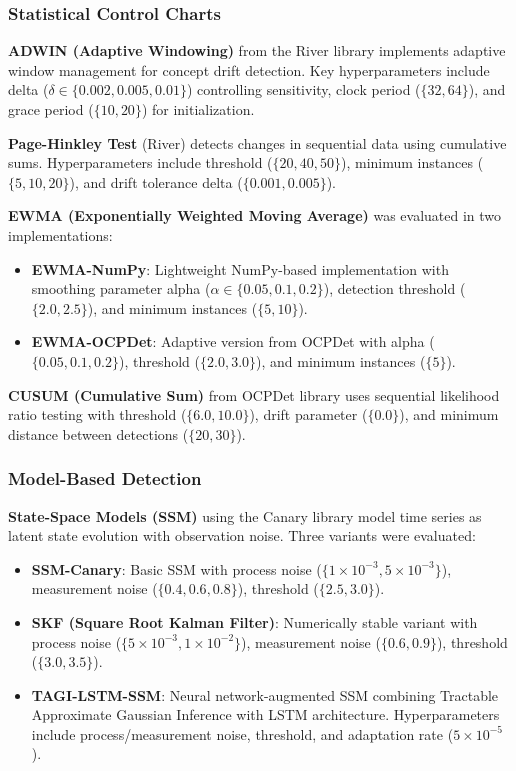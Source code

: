 \documentclass[journal,article,submit,pdftex,moreauthors]{Definitions/mdpi}
\begin{document}
\subsubsection{Statistical Control Charts}

\textbf{ADWIN (Adaptive Windowing)} from the River library implements adaptive window management for concept drift detection. Key hyperparameters include delta ($\delta \in \{0.002, 0.005, 0.01\}$) controlling sensitivity, clock period ($\{32, 64\}$), and grace period ($\{10, 20\}$) for initialization.

\textbf{Page-Hinkley Test} (River) detects changes in sequential data using cumulative sums. Hyperparameters include threshold ($\{20, 40, 50\}$), minimum instances ($\{5, 10, 20\}$), and drift tolerance delta ($\{0.001, 0.005\}$).

\textbf{EWMA (Exponentially Weighted Moving Average)} was evaluated in two implementations:
\begin{itemize}
    \item \textbf{EWMA-NumPy}: Lightweight NumPy-based implementation with smoothing parameter alpha ($\alpha \in \{0.05, 0.1, 0.2\}$), detection threshold ($\{2.0, 2.5\}$), and minimum instances ($\{5, 10\}$).
    \item \textbf{EWMA-OCPDet}: Adaptive version from OCPDet with alpha ($\{0.05, 0.1, 0.2\}$), threshold ($\{2.0, 3.0\}$), and minimum instances ($\{5\}$).
\end{itemize}

\textbf{CUSUM (Cumulative Sum)} from OCPDet library uses sequential likelihood ratio testing with threshold ($\{6.0, 10.0\}$), drift parameter ($\{0.0\}$), and minimum distance between detections ($\{20, 30\}$).

\subsubsection{Model-Based Detection}

\textbf{State-Space Models (SSM)} using the Canary library model time series as latent state evolution with observation noise. Three variants were evaluated:
\begin{itemize}
    \item \textbf{SSM-Canary}: Basic SSM with process noise ($\{1 \times 10^{-3}, 5 \times 10^{-3}\}$), measurement noise ($\{0.4, 0.6, 0.8\}$), threshold ($\{2.5, 3.0\}$).
    \item \textbf{SKF (Square Root Kalman Filter)}: Numerically stable variant with process noise ($\{5 \times 10^{-3}, 1 \times 10^{-2}\}$), measurement noise ($\{0.6, 0.9\}$), threshold ($\{3.0, 3.5\}$).
    \item \textbf{TAGI-LSTM-SSM}: Neural network-augmented SSM combining Tractable Approximate Gaussian Inference with LSTM architecture. Hyperparameters include process/measurement noise, threshold, and adaptation rate ($5 \times 10^{-5}$).
\end{itemize}
\end{document}

